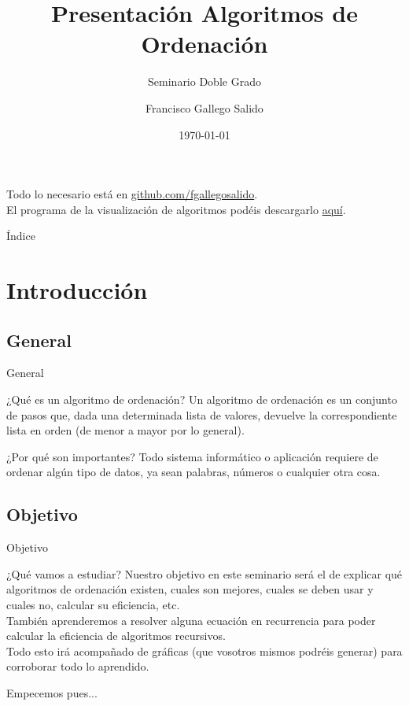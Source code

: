 \documentclass[compress]{beamer}
\title{Presentación Algoritmos de Ordenación}                                               %
\subtitle{Seminario Doble Grado}                                  %
\author{Francisco Gallego Salido}
\institute{Universidad de Granada}
\date{\today}                                                            %
\begin{document}
\begin{frame}
\titlepage
\end{frame}

\begin{frame}
Todo lo necesario está en \href{https://github.com/fgallegosalido}{github.com/fgallegosalido}.\\
\vspace{0.25in}
El programa de la visualización de algoritmos podéis descargarlo \href{https://panthema.net/2013/sound-of-sorting/}{aqu\'i}.
\end{frame}

\begin{frame}{Índice}
  \hypertarget{index}{}
  \tableofcontents
\end{frame}

\section{Introducción}
\subsection{General}

\begin{frame}{General}
	\begin{block}{¿Qué es un algoritmo de ordenación?}
	Un algoritmo de ordenación es un conjunto de pasos que, dada una determinada lista de valores, devuelve la correspondiente lista en orden (de menor a mayor por lo general).
	\end{block}
	
	\begin{block}{¿Por qué son importantes?}
	Todo sistema informático o aplicación requiere de ordenar algún tipo de datos, ya sean palabras, números o cualquier otra cosa.
	\end{block}
\end{frame}

\subsection{Objetivo}

\begin{frame}{Objetivo}
	\begin{block}{¿Qué vamos a estudiar?}
	Nuestro objetivo en este seminario será el de explicar qué algoritmos de ordenación existen, cuales son mejores, cuales se deben usar y cuales no, calcular su eficiencia, etc.\\
	\vspace{0.20in}
	También aprenderemos a resolver alguna ecuación en recurrencia para poder calcular la eficiencia de algoritmos recursivos.\\
	\vspace{0.20in}
	Todo esto irá acompañado de gráficas (que vosotros mismos podréis generar) para corroborar todo lo aprendido.
	\end{block}
Empecemos pues...
\end{frame}
\end{document}
